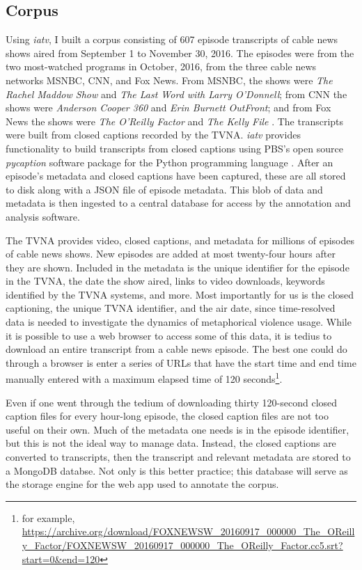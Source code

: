 \subsection{Corpus}
\label{sub:Corpus}

Using \textit{iatv}, I built a corpus consisting of 
607 episode transcripts of cable news shows aired from September 1
to November 30, 2016. The episodes were from the two most-watched programs in October, 2016, from
the three cable news networks MSNBC, CNN, and Fox News. From MSNBC, the shows
were \textit{The Rachel Maddow Show} and \textit{The Last Word with Larry O'Donnell};
from CNN the shows were \textit{Anderson Cooper 360} and \textit{Erin Burnett OutFront};
and from Fox News the shows were \textit{The O'Reilly Factor} and 
\textit{The Kelly File} \cite{Katz2016}.  The transcripts were built from 
closed captions recorded by the TVNA. \textit{iatv} provides functionality to build
transcripts from closed captions using PBS's open source \textit{pycaption} 
software package for the Python programming language \cite{PBS2016}. 
After an episode's metadata and closed 
captions have been captured, these are all stored to disk along with a JSON
file of episode metadata. This blob of data and metadata is then ingested 
to a central database for access by the annotation and analysis software.

The TVNA provides video, closed captions, and metadata for 
millions of episodes of cable news shows. New episodes are added at most twenty-four
hours after they are shown. Included in the metadata is the 
unique identifier for the episode in the TVNA, the date the show aired, links to video downloads, 
keywords identified by the TVNA systems, and more. Most importantly for us 
is the closed captioning, the unique TVNA identifier, and the air date, since
time-resolved data is needed to investigate the dynamics of metaphorical
violence usage. While it is possible to use a web browser to access some of this
data, it is tedius to download an entire transcript from a cable news 
episode. The best one could do through a browser is enter a series of URLs that
have the start time and end time manually entered with a maximum elapsed time
of 120 seconds\footnote{for example, \url{https://archive.org/download/FOXNEWSW_20160917_000000_The_OReilly_Factor/FOXNEWSW_20160917_000000_The_OReilly_Factor.cc5.srt?start=0&end=120}}.

Even if one went through the tedium of downloading thirty 120-second closed
caption files for every hour-long episode, the closed caption files are not
too useful on their own. Much of the metadata one needs is in 
the episode identifier, but this is not the ideal way to manage data. Instead,
the closed captions are converted to transcripts, then the transcript and 
relevant metadata are stored to a MongoDB databse. Not only is this better
practice; this database will serve as the storage engine for the web app
used to annotate the corpus.

